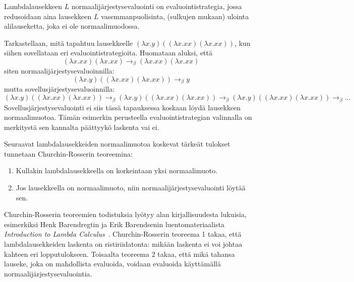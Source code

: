 \begin{alg}[normaalijärjestysevaluointi]
Lambdalausekkeen $L$ normaalijärjestysevaluointi on evaluointistrategia, jossa redusoidaan aina lausekkeen $L$ vasemmanpuolisinta, (sulkujen mukaan) ulointa alilauseketta, joka ei ole normaalimuodossa.
\end{alg}

\begin{esim}
Tarkastellaan, mitä tapahtuu lausekkeelle $(\lambda x . y) ((\lambda x . xx) (\lambda x . xx))$, kun siihen sovellataan eri evaluointistrategioita. Huomataan aluksi, että  
\[ (\lambda x . xx) (\lambda x . xx) \rightarrow_{\beta} (\lambda x . xx) (\lambda x . xx) \]
siten normaalijärjestysevaluoinnilla:
\[ (\lambda x . y) ((\lambda x . xx) (\lambda x . xx)) \rightarrow_{\beta} y \]
mutta sovellusjärjestysevaluoinnilla:
\[  (\lambda x . y) ((\lambda x . xx) (\lambda x . xx)) \rightarrow_{\beta}
	(\lambda x . y) ((\lambda x . xx) (\lambda x . xx)) \rightarrow_{\beta}
	(\lambda x . y) ((\lambda x . xx) (\lambda x . xx)) \rightarrow_{\beta} \ldots \]
Sovellusjärjestysevaluointi ei siis tässä tapauksessa koskaan löydä lausekkeen normaalimuotoa. Tämän esimerkin perusteella evaluointistrategian valinnalla on merkitystä sen kannalta päättyykö laskenta vai ei. 
\end{esim}
\par
Seuraavat lambdalausekkeiden normaalimuotoa koskevat tärkeät tulokset tunnetaan Churchin-Rosserin teoreemina: 
\begin{lau}
\begin{enumerate} $ $ %
	\item Kullakin lambdalausekkeella on korkeintaan yksi normaalimuoto.
	\item Jos lausekkeella on normaalimuoto, niin normaalijärjestysevaluointi löytää sen. 
\end{enumerate}
\end{lau}
\par
Churchin-Rosserin teoreemien todistuksia lyötyy alan kirjallisuudesta lukuisia, esimerkiksi Henk Barendregtin ja Erik Barendsenin luentomateriaalista \textit{Introduction to Lambda Calculus}~\cite[s.~23--30]{HBEB2000}. Churchin-Rosserin teoreema 1 takaa, että lambdalausekkeiden laskenta on ristiriidatonta: mikään laskenta ei voi johtaa kahteen eri lopputulokseen. Toisaalta teoreema 2 takaa, että mikä tahansa lauseke, joka on mahdollista evaluoida, voidaan evaluoida käyttämällä normaalijärjestysevaluointia.
